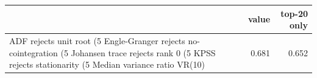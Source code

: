 \begin{tabular}{lrr}
\toprule
 & value & top-20 only \\
\midrule
ADF rejects unit root (5%
Engle-Granger rejects no-cointegration (5%
Johansen trace rejects rank 0 (5%
KPSS rejects stationarity (5%
Median variance ratio VR(10) & 0.681 & 0.652 \\
\bottomrule
\end{tabular}
